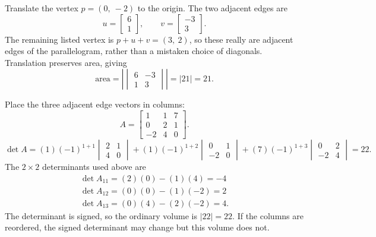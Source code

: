 Translate the vertex $p=\left( 0, \  -2\right)$ to the origin. The two adjacent edges are
\[u=\begin{bmatrix}6\\1\end{bmatrix},\qquad v=\begin{bmatrix}-3\\3\end{bmatrix}.\]
The remaining listed vertex is $p+u+v=\left( 3, \  2\right)$, so these really are adjacent edges of the parallelogram, rather than a mistaken choice of diagonals. Translation preserves area, giving
\[\text{area}=\left|\begin{vmatrix}6&-3\\1&3\end{vmatrix}\right|=|21|=21.\]


Place the three adjacent edge vectors in columns:
\[A=\begin{bmatrix}1&1&7\\0&2&1\\-2&4&0\end{bmatrix}.\]
\[
\det A=(1)(-1)^{1+1}\begin{vmatrix}2&1\\4&0\end{vmatrix} + (1)(-1)^{1+2}\begin{vmatrix}0&1\\-2&0\end{vmatrix} + (7)(-1)^{1+3}\begin{vmatrix}0&2\\-2&4\end{vmatrix}=22.
\]
The $2\times2$ determinants used above are
\[
\begin{gathered}\det A_{11}=(2)(0)-(1)(4)=-4\\\det A_{12}=(0)(0)-(1)(-2)=2\\\det A_{13}=(0)(4)-(2)(-2)=4.\end{gathered}
\]
The determinant is signed, so the ordinary volume is $|22|=22$. If the columns are reordered, the signed determinant may change but this volume does not.


